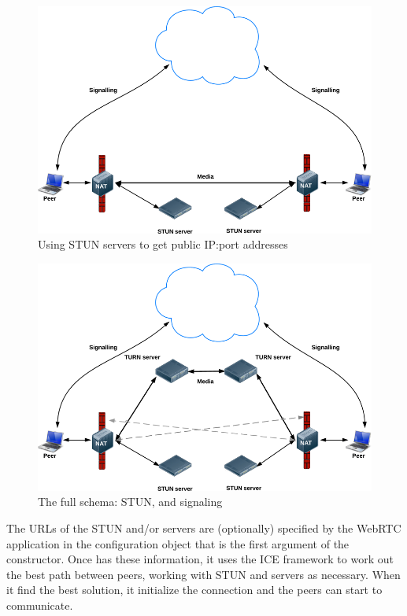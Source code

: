 \begin{figure}[ht]
  \centering
  \includegraphics[keepaspectratio=true, width=\textwidth]{images/stun}\caption{Using STUN servers to get public IP:port addresses}
  \label{fig:stun}
\end{figure}

\begin{figure}[ht]
  \centering
  \includegraphics[keepaspectratio=true, width=\textwidth]{images/turn}\caption{The full schema: STUN, \TURN and signaling}
  \label{fig:turn}
\end{figure}

The URLs of the STUN and/or \TURN servers are (optionally) specified by the WebRTC application in the configuration object that is the first argument of the \RTCPeerConnection constructor. Once \RTCPeerConnection has these information, it uses the ICE framework to work out the best path between peers, working with STUN and \TURN servers as necessary. When it find the best solution, it initialize the connection and the peers can start to communicate.

